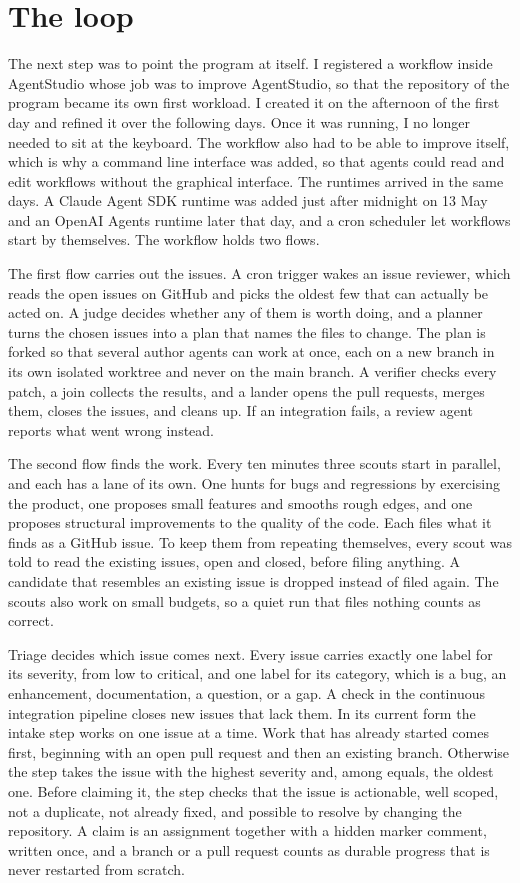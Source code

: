 \documentclass[11pt,a4paper]{article}
\begin{document}
\section{The loop}

The next step was to point the program at itself.
I registered a workflow inside AgentStudio whose job was to improve AgentStudio, so that the
repository of the program became its own first workload.
I created it on the afternoon of the first day and refined it over the following days.
Once it was running, I no longer needed to sit at the keyboard.
The workflow also had to be able to improve itself, which is why a command line interface was
added, so that agents could read and edit workflows without the graphical interface.
The runtimes arrived in the same days.
A Claude Agent SDK runtime was added just after midnight on 13 May and an OpenAI Agents runtime
later that day, and a cron scheduler let workflows start by themselves.
The workflow holds two flows.

The first flow carries out the issues.
A cron trigger wakes an issue reviewer, which reads the open issues on GitHub and picks the
oldest few that can actually be acted on.
A judge decides whether any of them is worth doing, and a planner turns the chosen issues into
a plan that names the files to change.
The plan is forked so that several author agents can work at once, each on a new branch in its
own isolated worktree and never on the main branch.
A verifier checks every patch, a join collects the results, and a lander opens the pull
requests, merges them, closes the issues, and cleans up.
If an integration fails, a review agent reports what went wrong instead.

The second flow finds the work.
Every ten minutes three scouts start in parallel, and each has a lane of its own.
One hunts for bugs and regressions by exercising the product, one proposes small features and
smooths rough edges, and one proposes structural improvements to the quality of the code.
Each files what it finds as a GitHub issue.
To keep them from repeating themselves, every scout was told to read the existing issues, open
and closed, before filing anything.
A candidate that resembles an existing issue is dropped instead of filed again.
The scouts also work on small budgets, so a quiet run that files nothing counts as correct.

Triage decides which issue comes next.
Every issue carries exactly one label for its severity, from low to critical, and one label for
its category, which is a bug, an enhancement, documentation, a question, or a gap.
A check in the continuous integration pipeline closes new issues that lack them.
In its current form the intake step works on one issue at a time.
Work that has already started comes first, beginning with an open pull request and then an
existing branch.
Otherwise the step takes the issue with the highest severity and, among equals, the oldest one.
Before claiming it, the step checks that the issue is actionable, well scoped, not a duplicate,
not already fixed, and possible to resolve by changing the repository.
A claim is an assignment together with a hidden marker comment, written once, and a branch or a
pull request counts as durable progress that is never restarted from scratch.
\end{document}
